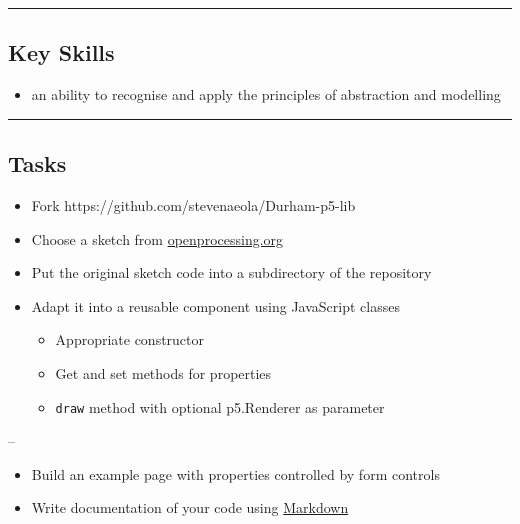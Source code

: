 \documentclass[]{article}
\providecommand{\tightlist}{%
  \setlength{\itemsep}{0pt}\setlength{\parskip}{0pt}}
\begin{document}
\begin{center}\rule{0.5\linewidth}{\linethickness}\end{center}

\hypertarget{key-skills}{%
\subsection{Key Skills}\label{key-skills}}

\begin{itemize}
\tightlist
\item
  an ability to recognise and apply the principles of abstraction and
  modelling
\end{itemize}

\begin{center}\rule{0.5\linewidth}{\linethickness}\end{center}

\hypertarget{tasks}{%
\subsection{Tasks}\label{tasks}}

\begin{itemize}
\tightlist
\item
  Fork https://github.com/stevenaeola/Durham-p5-lib
\item
  Choose a sketch from
  \href{https://www.openprocessing.org/}{openprocessing.org}
\item
  Put the original sketch code into a subdirectory of the repository
\item
  Adapt it into a reusable component using JavaScript classes

  \begin{itemize}
  \tightlist
  \item
    Appropriate constructor
  \item
    Get and set methods for properties
  \item
    \texttt{draw} method with optional p5.Renderer as parameter
  \end{itemize}
\end{itemize}

--

\begin{itemize}
\tightlist
\item
  Build an example page with properties controlled by form controls
\item
  Write documentation of your code using
  \href{https://guides.github.com/features/mastering-markdown/}{Markdown}
\end{itemize}
\end{document}
